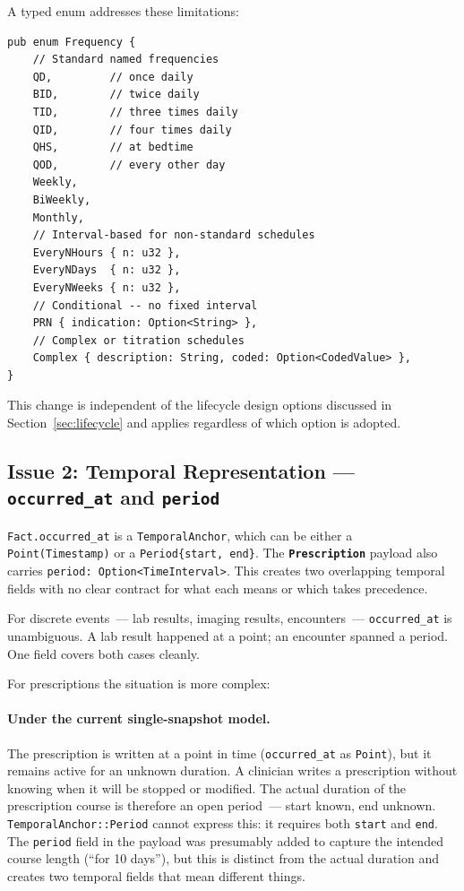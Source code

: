 \documentclass[11pt]{article}
\newcommand{\entity}[1]{\texttt{\textbf{#1}}}
\newcommand{\field}[1]{\texttt{#1}}
\begin{document}
A typed enum addresses these limitations:

\begin{lstlisting}
pub enum Frequency {
    // Standard named frequencies
    QD,         // once daily
    BID,        // twice daily
    TID,        // three times daily
    QID,        // four times daily
    QHS,        // at bedtime
    QOD,        // every other day
    Weekly,
    BiWeekly,
    Monthly,
    // Interval-based for non-standard schedules
    EveryNHours { n: u32 },
    EveryNDays  { n: u32 },
    EveryNWeeks { n: u32 },
    // Conditional -- no fixed interval
    PRN { indication: Option<String> },
    // Complex or titration schedules
    Complex { description: String, coded: Option<CodedValue> },
}
\end{lstlisting}

This change is independent of the lifecycle design options discussed
in Section~\ref{sec:lifecycle} and applies regardless of which option
is adopted.

\subsection{Issue 2: Temporal Representation --- \texttt{occurred\_at} and \texttt{period}}
\label{sec:temporal}

\field{Fact.occurred\_at} is a \field{TemporalAnchor}, which can be
either a \field{Point(Timestamp)} or a
\field{Period\{start, end\}}. The \entity{Prescription} payload also
carries \field{period: Option<TimeInterval>}. This creates two
overlapping temporal fields with no clear contract for what each means
or which takes precedence.

For discrete events~--- lab results, imaging results, encounters~---
\field{occurred\_at} is unambiguous. A lab result happened at a point;
an encounter spanned a period. One field covers both cases cleanly.

For prescriptions the situation is more complex:

\paragraph{Under the current single-snapshot model.}
The prescription is written at a point in time (\field{occurred\_at}
as \field{Point}), but it remains active for an unknown duration.
A clinician writes a prescription without knowing when it will be
stopped or modified. The actual duration of the prescription course is
therefore an open period~--- start known, end unknown.
\field{TemporalAnchor::Period} cannot express this: it requires both
\field{start} and \field{end}. The \field{period} field in the payload
was presumably added to capture the intended course length (``for 10
days''), but this is distinct from the actual duration and creates two
temporal fields that mean different things.
\end{document}
